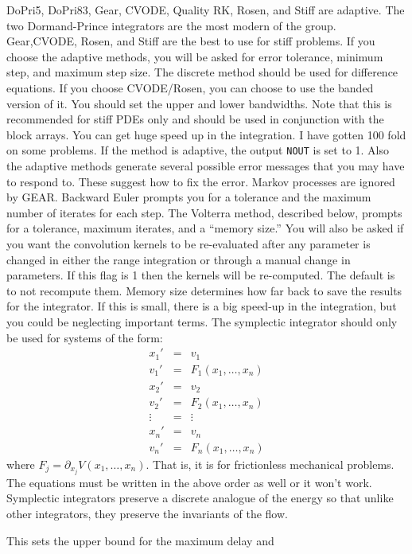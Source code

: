 \documentclass{article}
\begin{document}
\begin{description}
\begin{description}
\end{description}
DoPri5, DoPri83, Gear, CVODE, Quality RK, Rosen, and Stiff  are
 adaptive. The two Dormand-Prince integrators are
the most modern of the group.
 Gear,CVODE, Rosen, and Stiff are the best to use for stiff problems.  If you choose
the adaptive methods, you will be
 asked for error tolerance, minimum step, and maximum step size.  The discrete
 method should be used for difference equations.  
If you choose CVODE/Rosen, you can choose to use the banded version of
it. You should set the upper and lower bandwidths. Note that this is
recommended for stiff PDEs only and should be used in conjunction with
the block arrays.  
You can get huge speed up in the integration. I have gotten 100
fold on some problems. If the method is
adaptive, the
 output {\tt NOUT} is set to 1.  Also the adaptive methods generate several possible error messages
 that you may have to respond to.  These suggest how to fix the error.
 Markov processes are ignored by GEAR.
 Backward Euler prompts you for a tolerance and the maximum number of iterates
 for each step. The Volterra method, described below, prompts for
a tolerance, maximum iterates, and a ``memory size.''   You will also
be asked if you want the convolution kernels to be re-evaluated after
any parameter is changed in either the range integration or through a
manual change in parameters.  If this flag is 1 then the kernels will
be re-computed.  The default is to not recompute them. Memory size
determines how far back to save the results for the integrator. If
this is small, there is a big speed-up in the integration, but you
could be neglecting important terms.  The symplectic integrator should
only be used for systems of the form:
\begin{eqnarray*}
x_1' &=& v_1 \\
v_1' &=& F_1(x_1,\ldots,x_n) \\
x_2' &=& v_2 \\
v_2' &=& F_2(x_1,\ldots,x_n) \\
\vdots &=& \vdots \\
x_n' &=& v_n \\
v_n' &=& F_n(x_1,\ldots,x_n)
\end{eqnarray*}
where $F_j = \partial_{x_j} V(x_1,\ldots,x_n).$  That is, it is for
frictionless mechanical problems. The equations must be written in the
above order as well or it won't work.  Symplectic integrators preserve
a discrete analogue of the energy so that unlike other integrators,
they preserve the invariants of the flow. 
\item[d(E)lay]  This sets the upper bound for the maximum delay and

\end{description}
\end{document}
